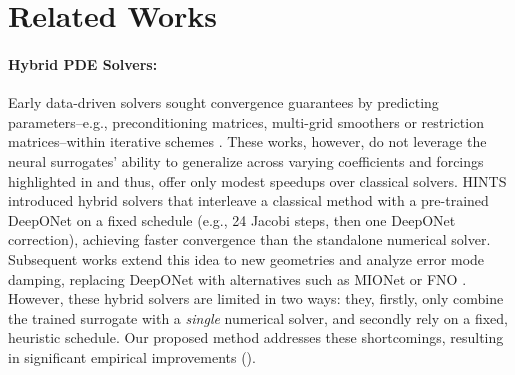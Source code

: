 \documentclass{article}
\begin{document}

\section{Related Works}

\paragraph{Hybrid PDE Solvers:}
Early data-driven solvers sought convergence guarantees by predicting parameters--e.g., preconditioning matrices, multi-grid smoothers or restriction matrices--within iterative schemes \citep{taghibakhshi2021optimization,caldana2024deep,kopanivcakova2025deeponet,huang2022learning,katrutsa2020black}. These works, however, do not leverage the neural surrogates' ability to generalize across varying coefficients and forcings highlighted in  and thus, offer only modest speedups over classical solvers. HINTS \citep{zhang2024blending} introduced hybrid solvers that interleave a classical method with a pre-trained DeepONet on a fixed schedule (e.g., 24 Jacobi steps, then one DeepONet correction), achieving faster convergence than the standalone numerical solver. 
Subsequent works extend this idea to new geometries \citep{kahana2023geometry} and analyze error mode damping, replacing DeepONet with alternatives such as MIONet \citep{jin2022mionet} \citep{hu2025hybrid} or FNO \citep{li2020fourier,cui2022fourier}. 
However, these hybrid solvers are limited in two ways: they, firstly, only combine the trained surrogate with a \textit{single} numerical solver, and secondly rely on a fixed, heuristic schedule. Our proposed method addresses these shortcomings, resulting in significant empirical improvements ().
\end{document}
